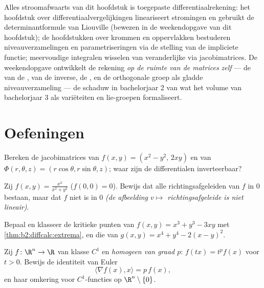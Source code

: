 \begin{remark}
Alles stroomafwaarts van dit hoofdstuk is toegepaste
differentiaalrekening: het hoofdstuk over
differentiaalvergelijkingen lineariseert stromingen en gebruikt de
determinantformule van Liouville (bewezen in de weekendopgave van
dit hoofdstuk); de hoofdstukken over krommen en oppervlakken
bestuderen niveauverzamelingen en parametriseringen via de stelling
van de impliciete functie; meervoudige integralen wisselen van
veranderlijke via jacobimatrices. De weekendopgave ontwikkelt de
rekening \emph{op de ruimte van de matrices zelf} --- de
 van de , van de inverse, de
, en de orthogonale groep als gladde
niveauverzameling --- de schaduw in bachelorjaar 2 van wat het
volume van bachelorjaar 3 als variëteiten en lie-groepen
formaliseert.
\end{remark}

\section{Oefeningen}

\begin{exercise}[$\star$]\label{exo:b2:diffcalc:1}
Bereken de jacobimatrices van $f(x,y) = (x^2 - y^2,\, 2xy)$ en van
$\Phi(r,\theta,z) = (r\cos\theta, r\sin\theta, z)$; waar zijn de
differentialen inverteerbaar?
\end{exercise}

\begin{exercise}[$\star$]\label{exo:b2:diffcalc:2}
Zij $f(x,y) = \frac{x^3}{x^2 + y^2}$ ($f(0,0) = 0$). Bewijs dat
alle richtingsafgeleiden van $f$ in $0$ bestaan, maar dat $f$ niet
 is in $0$ \emph{(de afbeelding $v \mapsto$
richtingsafgeleide is niet lineair)}.
\end{exercise}

\begin{exercise}[$\star$]\label{exo:b2:diffcalc:3}
Bepaal en klasseer de kritieke punten van $f(x, y) = x^3 + y^3 -
3xy$ met \cref{thm:b2:diffcalc:extrema}, en die van $g(x,y) = x^4 +
y^4 - 2(x - y)^2$.
\end{exercise}

\begin{exercise}[$\star\star$]\label{exo:b2:diffcalc:4}
Zij $f \colon \R^n \to \R$ van klasse $C^1$ en \emph{homogeen van
graad $p$}: $f(tx) = t^pf(x)$ voor $t > 0$. Bewijs de identiteit van
Euler
\[
\langle \nabla f(x), x\rangle = p\,f(x) ,
\]
en haar omkering voor $C^1$-functies op $\R^n\setminus\{0\}$.
\end{exercise}

